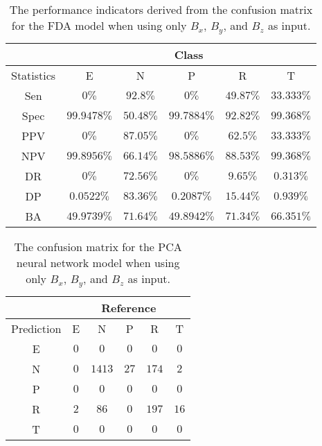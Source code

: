 \begin{table}[!ht]
	\centering
	\begin{tabular}{|c|c|c|c|c|c|}
		\hline
		 & \multicolumn{5}{c|}{Class} \\ \hline
		Statistics & E & N & P & R & T \\ \hline
		Sen & $0\%$ & $92.8\%$ & $0\%$ & $49.87\%$ & $33.333\%$ \\ \hline
		Spec & $99.9478\%$ & $50.48\%$ & $99.7884\%$ & $92.82\%$ & $99.368\%$ \\ \hline
		PPV & $0\%$ & $87.05\%$ & $0\%$ & $62.5\%$ & $33.333\%$ \\ \hline
		NPV & $99.8956\%$ & $66.14\%$ & $98.5886\%$ & $88.53\%$ & $99.368\%$ \\ \hline
		DR & $0\%$ & $72.56\%$ & $0\%$ & $9.65\%$ & $0.313\%$ \\ \hline
		DP & $0.0522\%$ & $83.36\%$ & $0.2087\%$ & $15.44\%$ & $0.939\%$ \\ \hline
		BA & $49.9739\%$ & $71.64\%$ & $49.8942\%$ & $71.34\%$ & $66.351\%$ \\ \hline
	\end{tabular}
	\caption{The performance indicators derived from the confusion matrix for the FDA model when using only $B_{x}$, $B_{y}$, and $B_{z}$ as input.}
	\label{tab:cs:reverse:coord:fda}
\end{table}

\begin{table}[!ht]
	\centering
	\begin{tabular}{|c|c|c|c|c|c|}
		\hline
		 & \multicolumn{5}{|c|}{Reference} \\ \hline
		 Prediction & E & N & P & R & T \\ \hline
		 E & $0$ & $0$ & $0$ & $0$ & $0$ \\ \hline
		 N & $0$ & $1413$ & $27$ & $174$ & $2$ \\ \hline
		 P & $0$ & $0$ & $0$ & $0$ & $0$ \\ \hline
		 R & $2$ & $86$ & $0$ & $197$ & $16$ \\ \hline
		 T & $0$ & $0$ & $0$ & $0$ & $0$ \\ \hline
	\end{tabular}
	\caption{The confusion matrix for the PCA neural network model when using only $B_{x}$, $B_{y}$, and $B_{z}$ as input.}
	\label{tab:cm:coord:pcaNNet}
\end{table}

